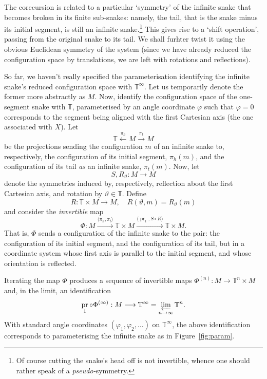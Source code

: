 \documentclass{article}
\def\TT{\mathbb{T}}
\DeclareMathOperator{\pr}{\mathrm{pr}}
\theoremstyle{definition}
\begin{document}
The corecursion is related
to a particular `symmetry' of the infinite snake that becomes broken
in its finite sub-snakes:
namely, the tail, that is the
snake minus its initial segment,
is still an infinite snake.\footnote{Of course cutting the snake's head off
is not invertible, whence one should rather speak of a \emph{pseudo-}symmetry.}
This gives rise to a `shift operation', passing from the original snake to its
tail. We shall furhter twist it using the obvious Euclidean symmetry of the system
(since we have already reduced the configuration space by translations,
we are left with rotations and reflections). 

So far, we haven't really specified the parameterisation identifying the infinite snake's
reduced configuration space with $\TT^\infty$. Let us temporarily denote the
former more abstractly as $M$. Now, identify the configuration space
of the one-segment snake with $\TT$, parameterised by an angle coordinate $\varphi$
such that $\varphi=0$ corresponds to the segment being aligned with the first
Cartesian axis (the one associated with $X$). Let $$ \TT \xleftarrow{\pi_h} M \xrightarrow{\pi_t} M $$
be the projections sending the configuration $m$ of an infinite snake 
to, respectively, the configuration of its initial segment, $\pi_h(m)$,
and the configuration
of its tail \emph{as} an infinite snake, $\pi_t(m)$.
Now, let $$ S, R_\vartheta : M \to M $$
denote the symmetries induced by, respectively,
reflection about the first Cartesian axis, and
rotation by $\vartheta \in \TT$. Define
$$ R : \TT \times M \to M,\quad R(\vartheta, m) = R_\vartheta(m) $$ 
and 
consider the \emph{invertible} map
$$
\Phi : M \xrightarrow{\langle \pi_h,\pi_t\rangle} \TT \times M
\xrightarrow{\langle \pr_1, S \circ R\rangle} \TT \times M.
$$
That is, $\Phi$ sends a configuration of the infinite snake
to the pair: the configuration of its initial segment, and
the configuration of its tail, but in a coordinate system
whose first axis is parallel to the initial segment, and
whose orientation is reflected.

Iterating the map $\Phi$ produces a sequence of invertible maps
$\Phi^{(n)} : M \to \TT^n \times M$ and, in the limit,
an identification 
$$\pr_1 \circ \Phi^{(\infty)} : M \longrightarrow \TT^\infty = \varprojlim_{n\to\infty} \TT^n.$$
With standard angle coordinates $(\varphi_1,\varphi_2,\dots)$ on $\TT^\infty$,
the above identification corresponds to parameterising the infinite snake
as in Figure~\ref{fig:param}.
\end{document}
